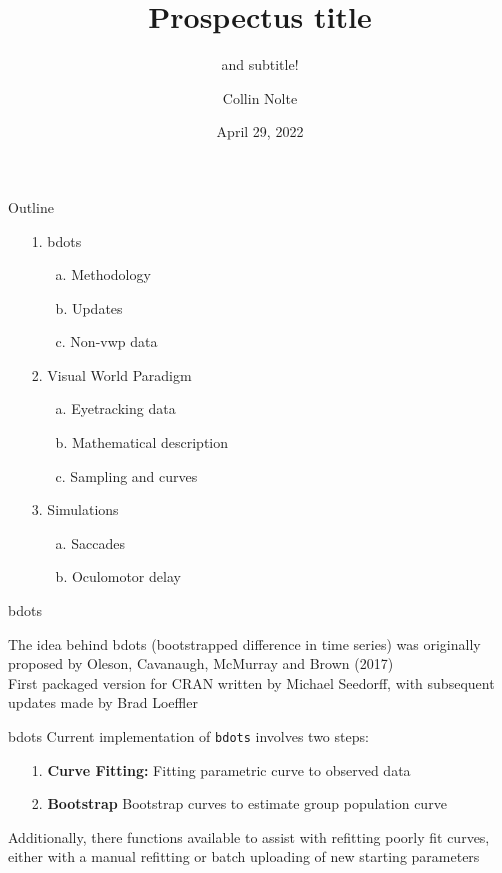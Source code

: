 \documentclass{beamer}
\title[UIowa Biostatistics]{Prospectus title}
\subtitle{and subtitle!}
\author{Collin Nolte}
\date{April 29, 2022}
\newcommand{\code}[1]{\texttt{#1}}
\begin{document}
\begin{frame}
  \titlepage
\end{frame}

\begin{frame}{Outline}
\begin{itemize}
\item[1.] bdots
  \begin{itemize}
  \item[a.] Methodology
  \item[b.] Updates
  \item[c.] Non-vwp data
  \end{itemize}
\item[2.] Visual World Paradigm
  \begin{itemize}
  \item[a.] Eyetracking data
  \item[b.] Mathematical description
  \item[c.] Sampling and curves
  \end{itemize}
\item[3.] Simulations
  \begin{itemize}
  \item[a.] Saccades
  \item[b.] Oculomotor delay
  \end{itemize}
\end{itemize}
\end{frame}


%

\begin{frame}{bdots}

The idea behind bdots (bootstrapped difference in time series) was originally proposed by Oleson, Cavanaugh, McMurray and Brown (2017) \newline \\

First packaged version for CRAN written by Michael Seedorff, with subsequent updates made by Brad Loeffler \newline \\


\end{frame}

\begin{frame}{bdots}
Current implementation of \code{bdots} involves two steps:
\begin{enumerate}
\item[1.] \textbf{Curve Fitting:} Fitting parametric curve to observed data
\item[2.] \textbf{Bootstrap} Bootstrap curves to estimate group population curve \newline
\end{enumerate}
Additionally, there functions available to assist with refitting poorly fit curves, either with a manual refitting or batch uploading of new starting parameters
\end{frame}
\end{document}
